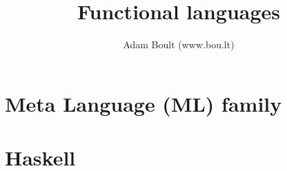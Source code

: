 \documentclass[oneside]{book}
\begin{document}
\author{Adam Boult (www.bou.lt)}
\title{Functional languages}
\maketitle

\setcounter{tocdepth}{0}
\tableofcontents



\part{Meta Language (ML) family}

\part{Haskell}
\end{document}

